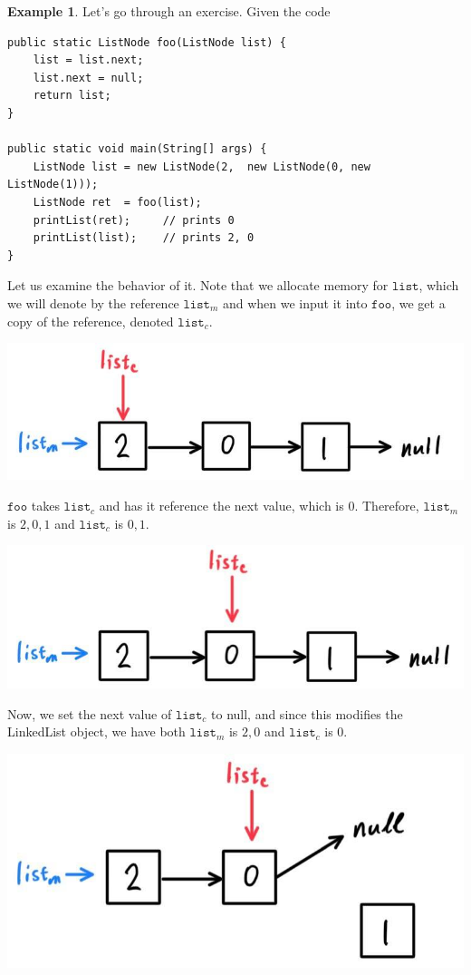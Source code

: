 \documentclass{article}
\theoremstyle{definition}
\newtheorem{example}{Example}[section]
\theoremstyle{remark}
\theoremstyle{definition}
\begin{document}
\begin{example}
Let's go through an exercise. Given the code 
\begin{verbatim}
public static ListNode foo(ListNode list) {
    list = list.next; 
    list.next = null; 
    return list; 
}

public static void main(String[] args) {
    ListNode list = new ListNode(2,  new ListNode(0, new ListNode(1))); 
    ListNode ret  = foo(list); 
    printList(ret);     // prints 0 
    printList(list);    // prints 2, 0 
}
\end{verbatim}
Let us examine the behavior of it. Note that we allocate memory for $\texttt{list}$, which we will denote by the reference $\texttt{list}_m$ and when we input it into $\texttt{foo}$, we get a copy of the reference, denoted $\texttt{list}_c$. 
\begin{center}
    \includegraphics[scale=0.3]{img/step1.jpg}
\end{center}
$\texttt{foo}$ takes $\texttt{list}_c$ and has it reference the next value, which is $0$. Therefore, $\texttt{list}_m$ is $2, 0, 1$ and $\texttt{list}_c$ is $0, 1$. 
\begin{center}
    \includegraphics[scale=0.3]{img/step2.jpg}
\end{center}
Now, we set the next value of $\texttt{list}_c$ to null, and since this modifies the LinkedList object, we have both $\texttt{list}_m$ is $2, 0$ and $\texttt{list}_c$ is $0$. 
\begin{center}
    \includegraphics[scale=0.3]{img/step3.jpg}
\end{center}
\end{example}
\end{document}
